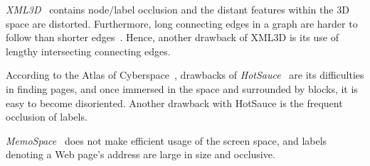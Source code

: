 \documentclass[10pt,psfig]{article}
\begin{document}
{%
{\em XML3D}~\cite{rcmc-00} contains node/label occlusion and the distant features within the 3D space are distorted.
Furthermore, long connecting edges in a graph are harder to follow than shorter edges~\cite{dett-gd-99}.
Hence, another drawback of XML3D is its use of lengthy intersecting connecting edges.

According to the Atlas of Cyberspace~\cite{atlas}, drawbacks of {\em HotSauce}~\cite{g02} are its difficulties in finding pages, and once immersed in the space and surrounded by blocks, it is easy to become disoriented.
Another drawback with HotSauce is the frequent occlusion of labels.


{\em MemoSpace}~\cite{wls05}  does not make efficient usage of the screen space, and labels denoting a Web page's address are large in size and occlusive.

}
\end{document}
